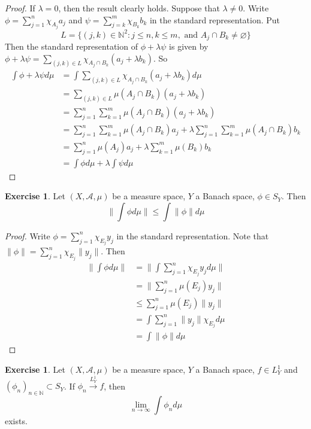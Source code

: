 \documentclass{book}
\theoremstyle{definition}
\newtheorem{ex}[definition]{Exercise}
\newcommand{\lam}{\lambda}
\newcommand{\N}{\mathbb{N}}
\newcommand{\MA}{\mathcal{A}}
\newcommand{\lex}[1]{\label{ex:#1}}
\DeclareMathOperator*{\0}{\mbf{0}}
\DeclareMathOperator*{\1}{\mbf{1}}
\newcommand{\limn}{\lim \limits_{n \rightarrow \infty}}
\newcommand{\conv}[1]{\xrightarrow{#1}}
\begin{document}
	\begin{proof}
	If $\lam =0$, then the result clearly holds. Suppose that $\lam \neq 0$.	Write $\phi = \sum\limits_{j=1}^n\chi_{A_j}a_j$ and $\psi = \sum\limits_{j=k}^m\chi_{B_k}b_k$ in the standard representation. Put $$L = \{(j,k) \in \N^2: j \leq n, k \leq m, \text{ and } A_j \cap B_k \neq \varnothing\}$$ Then the standard representation of $\phi + \lam \psi$ is given by  $\phi + \lam \psi = \sum\limits_{(j,k) \in L} \chi_{A_j \cap B_k}(a_j + \lam b_k)$.
	So 
	\begin{align*}
	\int \phi + \lam \psi d \mu 
	&= \int \sum_{(j,k) \in L} \chi_{A_j \cap B_k}(a_j + \lam b_k) d \mu \\
	&= \sum_{(j,k) \in L} \mu(A_j \cap B_k)(a_j + \lam b_k) \\
	&= \sum_{j = 1}^n \sum_{k=1}^m \mu(A_j \cap B_k)(a_j + \lam b_k)  \\ 
	&= \sum_{j = 1}^n \sum_{k=1}^m \mu(A_j \cap B_k)a_j + \lam \sum_{j = 1}^n \sum_{k=1}^m \mu(A_j \cap B_k) b_k \\
	&= \sum_{j = 1}^n \mu(A_j)a_j +  \lam\sum_{k=1}^m \mu(B_k) b_k \\
	&= \int \phi d \mu + \lam \int \psi d\mu 
	\end{align*}
	\end{proof}

	\begin{ex} \lex{00000} 
	Let $(X, \MA, \mu)$ be a measure space, $Y$ a Banach space, $\phi \in S_Y$. Then $$\bigg \| \int \phi d\mu   \bigg \|  \leq \int \|\phi \| d \mu$$
	\end{ex}
	
	\begin{proof}
	Write $\phi = \sum\limits_{j=1}^n\chi_{E_j}y_j$ in the standard representation. Note that $\|\phi \| = \sum\limits_{j=1}^n\chi_{E_j} \|y_j\|$. Then 
	\begin{align*}
	\bigg \|  \int \phi d\mu  \bigg \| 
	&=  \bigg \|  \int \sum\limits_{j=1}^n\chi_{E_j}y_j  d\mu  \bigg \| \\
	&= \bigg \| \sum\limits_{j=1}^n \mu(E_j)y_j \bigg \| \\
	& \leq \sum\limits_{j=1}^n \mu(E_j) \|y_j \| \\
	&= \int \sum\limits_{j=1}^n \|y_j \| \chi_{E_j} d \mu \\
	&= \int \|\phi \| d\mu
	\end{align*}
	\end{proof}
	
	\begin{ex} \lex{00000} 
	Let $(X, \MA, \mu)$ be a measure space, $Y$ a Banach space, $f \in L^1_Y$ and $(\phi_n)_{n \in \N} \subset S_Y$. If $\phi_n \conv{L^1_Y} f$, then $$\limn \int \phi_n d\mu $$ exists.
	\end{ex}
	
\end{document}
